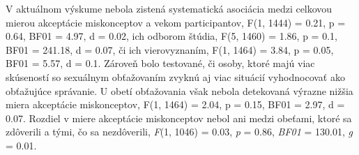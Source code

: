 \documentclass[
]{article}
\begin{document}
\begin{table}[H]

\caption{\label{tab:miscM}Distribúcia odpovedí u mužov}
\centering
{}
\end{table}

V aktuálnom výskume nebola zistená systematická asociácia medzi celkovou mierou akceptácie miskonceptov a vekom participantov, F(1, 1444) = 0.21, p = 0.64, BF01 = 4.97, d = 0.02, ich odborom štúdia, F(5, 1460) = 1.86, p = 0.1, BF01 = 241.18, d = 0.07, či ich vierovyznaním, F(1, 1464) = 3.84, p = 0.05, BF01 = 5.57, d = 0.1. Zároveň bolo testované, či osoby, ktoré majú viac skúseností so sexuálnym obťažovaním zvyknú aj viac situácií vyhodnocovať ako obťažujúce správanie. U obetí obťažovania však nebola detekovaná výrazne nižšia miera akceptácie miskonceptov, F(1, 1464) = 2.04, p = 0.15, BF01 = 2.97, d = 0.07. Rozdiel v miere akceptácie miskonceptov nebol ani medzi obeťami, ktoré sa zdôverili a tými, čo sa nezdôverili, \emph{F}(1, 1046) = 0.03, \emph{p} = 0.86, \emph{BF01} = 130.01, \emph{g} = 0.01.
\end{document}

